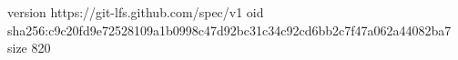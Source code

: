 version https://git-lfs.github.com/spec/v1
oid sha256:c9c20fd9e72528109a1b0998c47d92bc31c34c92cd6bb2c7f47a062a44082ba7
size 820
